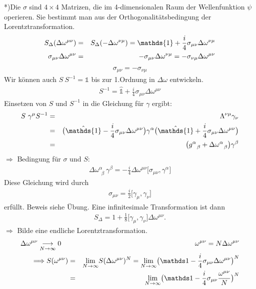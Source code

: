 *)Die $\sigma$ sind $4\times 4$ Matrizen, die im 4-dimensionalen Raum der Wellenfunktion $\psi$ operieren. Sie bestimmt man aus der Orthogonalitätsbedingung der Lorentztransformation.
\begin{eqnarray*}
S_{\Delta}(\Delta \omega^{\mu\nu}) \g S_{\Delta} (-\Delta\omega^{\nu\mu}) = \mathds{1} + \frac i 4 \sigma_{\mu\nu}\Delta \omega^{\nu\mu}\\
\sigma_{\mu\nu}\Delta\omega^{\mu\nu} \g - \sigma_{\mu\nu}\Delta\omega^{\nu\mu} = - \sigma_{\nu\mu} \Delta\omega^{\mu\nu}\end{eqnarray*}
\begin{eqnarray*} \boxed{\sigma_{\mu\nu} = - \sigma_{\nu\mu}}\end{eqnarray*}
Wir können auch $S \ S^{-1} = \mathds{1}$ bis zur 1.Ordnung in $\Delta \omega$ entwickeln.
\begin{eqnarray*} S^{-1} = \hat {\mathds{1}} + \frac i 4 \sigma_{\mu\nu} \Delta\omega^{\mu\nu}\end{eqnarray*}
Einsetzen von $S$ und $S^{-1}$ in die Gleichung für $\gamma$ ergibt:
\begin{eqnarray*} S \ \gamma^{\mu}S^{-1} \g \Lambda^{\nu\mu} \gamma_{\nu}\\
\g \big ( \hat {\mathds{1}} - \frac i 4 \sigma_{\mu\nu} \Delta\omega^{\mu\nu}\big) \gamma^{\alpha} \big ( \hat {\mathds{1}} + \frac i 4 \sigma_{\mu\nu} \Delta\omega^{\mu\nu}\big)\\
\g \big ( g^{\alpha}_{\ \ \beta} + \Delta\omega^{\alpha}_{\ \ \beta} \big ) \gamma^{\beta}
\end{eqnarray*}
$\Longrightarrow$ Bedingung für $\sigma$ und $S$:
\begin{eqnarray*} \Delta \omega^{\alpha}_{\ \ \beta} \ \gamma^{\beta} = - \frac i 4 \Delta \omega^{\mu\nu} \big[\sigma_{\mu\nu}, \gamma^{\alpha}\big ]\end{eqnarray*}
Diese Gleichung wird durch
\begin{eqnarray*}
	\boxed{ \sigma_{\mu\nu} = \frac i 2 \big[\gamma_{\mu},\gamma_{\nu}\big ]}
\end{eqnarray*}
erfüllt. Beweis siehe Übung. Eine infinitesimale Transformation ist dann
\begin{eqnarray*} S_{\Delta} = 1 + \frac 1 8 \big[\gamma_{\mu},\gamma_{\nu}\big]\Delta\omega^{\mu\nu}. \end{eqnarray*}
$\Longrightarrow$ Bilde eine endliche Lorentztransformation.
\begin{eqnarray*}
\Delta \omega^{\mu\nu}\underset{N \rightarrow\infty}{\longrightarrow} 0 \quad &{}&\quad \omega^{\mu\nu} = N \Delta\omega^{\mu\nu}\\
\Longrightarrow S(\omega^{\mu\nu}) \g \underset{N \rightarrow \infty}{\lim}S(\Delta \omega^{\mu\nu})^N = \underset{N \rightarrow \infty}{\lim} \big( \mathds 1 - \frac i 4 \sigma_{\mu\nu}\Delta\omega^{\mu\nu}\big)^N\\
\g \underset{N \rightarrow \infty}{\lim} \big( \mathds 1  - \frac i 4 \sigma_{\mu\nu}\frac{\omega^{\mu\nu}} N\big)^N
\end{eqnarray*}
